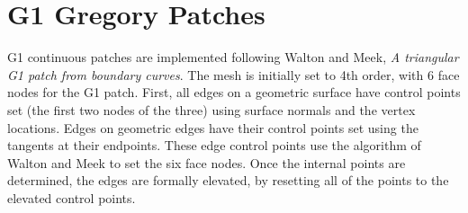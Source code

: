 \documentclass{article}
\begin{document}
\section{G1 Gregory Patches}
G1 continuous patches are implemented following Walton and Meek, \textit{A triangular G1 patch from boundary curves}. The mesh is initially set to 4th order, with 6 face nodes for the G1 patch. First, all edges on a geometric surface have control points set (the first two nodes of the three) using surface normals and the vertex locations. Edges on geometric edges have their control points set using the tangents at their endpoints. These edge control points use the algorithm of Walton and Meek to set the six face nodes. Once the internal points are determined, the edges are formally elevated, by resetting all of the points to the elevated control points.
\end{document}
